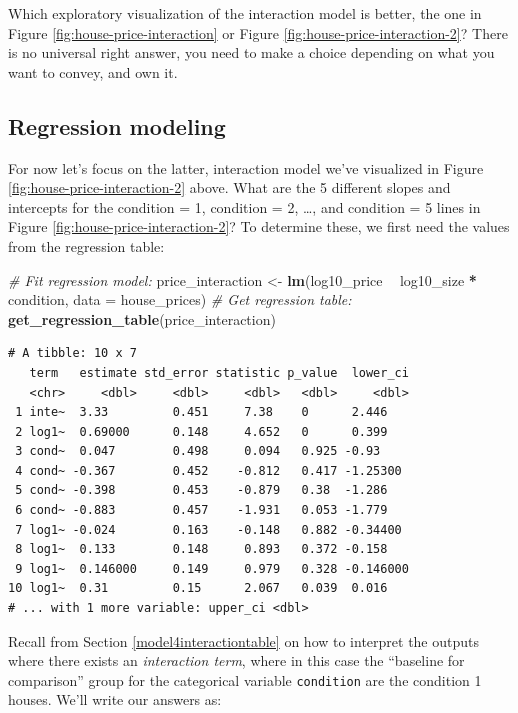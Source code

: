 \documentclass[12pt, krantz2,]{krantz}
\makeatletter
\newenvironment{Shaded}{\begin{snugshade}}{\end{snugshade}}
\newcommand{\CommentTok}[1]{\textcolor[rgb]{0.37,0.37,0.37}{\textit{#1}}}
\newcommand{\DataTypeTok}[1]{\textcolor[rgb]{0.27,0.27,0.27}{#1}}
\newcommand{\KeywordTok}[1]{\textcolor[rgb]{0.27,0.27,0.27}{\textbf{#1}}}
\newcommand{\NormalTok}[1]{#1}
\newcommand{\OperatorTok}[1]{\textcolor[rgb]{0.43,0.43,0.43}{\textbf{#1}}}
\newcommand{\StringTok}[1]{\textcolor[rgb]{0.5,0.5,0.5}{#1}}
\newenvironment{kframe}{%
\medskip{}
\setlength{\fboxsep}{.8em}
 \def\at@end@of@kframe{}%
 \ifinner\ifhmode%
  \def\at@end@of@kframe{\end{minipage}}%
  \begin{minipage}{\columnwidth}%
 \fi\fi%
 \def\FrameCommand##1{\hskip\@totalleftmargin \hskip-\fboxsep
 \colorbox{shadecolor}{##1}\hskip-\fboxsep
     \hskip-\linewidth \hskip-\@totalleftmargin \hskip\columnwidth}%
 \MakeFramed {\advance\hsize-\width
   \@totalleftmargin\z@ \linewidth\hsize
   \@setminipage}}%
 {\par\unskip\endMakeFramed%
 \at@end@of@kframe}
\renewenvironment{Shaded}{\begin{kframe}}{\end{kframe}}
\makeatother
\begin{document}
Which exploratory visualization of the interaction model is better, the one in Figure \ref{fig:house-price-interaction} or Figure \ref{fig:house-price-interaction-2}? There is no universal right answer, you need to make a choice depending on what you want to convey, and own it.

\hypertarget{house-prices-regression}{%
\subsection{Regression modeling}\label{house-prices-regression}}

For now let's focus on the latter, interaction model we've visualized in Figure \ref{fig:house-price-interaction-2} above. What are the 5 different slopes and intercepts for the condition = 1, condition = 2, \ldots{}, and condition = 5 lines in Figure \ref{fig:house-price-interaction-2}? To determine these, we first need the values from the regression table:

\begin{Shaded}
\begin{Highlighting}[]
\CommentTok{# Fit regression model:}
\NormalTok{price_interaction <-}\StringTok{ }\KeywordTok{lm}\NormalTok{(log10_price }\OperatorTok{~}\StringTok{ }\NormalTok{log10_size }\OperatorTok{*}\StringTok{ }\NormalTok{condition, }\DataTypeTok{data =}\NormalTok{ house_prices)}
\CommentTok{# Get regression table:}
\KeywordTok{get_regression_table}\NormalTok{(price_interaction)}
\end{Highlighting}
\end{Shaded}

\begin{verbatim}
# A tibble: 10 x 7
   term   estimate std_error statistic p_value  lower_ci
   <chr>     <dbl>     <dbl>     <dbl>   <dbl>     <dbl>
 1 inte~  3.33         0.451     7.38    0      2.446   
 2 log1~  0.69000      0.148     4.652   0      0.399   
 3 cond~  0.047        0.498     0.094   0.925 -0.93    
 4 cond~ -0.367        0.452    -0.812   0.417 -1.25300 
 5 cond~ -0.398        0.453    -0.879   0.38  -1.286   
 6 cond~ -0.883        0.457    -1.931   0.053 -1.779   
 7 log1~ -0.024        0.163    -0.148   0.882 -0.34400 
 8 log1~  0.133        0.148     0.893   0.372 -0.158   
 9 log1~  0.146000     0.149     0.979   0.328 -0.146000
10 log1~  0.31         0.15      2.067   0.039  0.016   
# ... with 1 more variable: upper_ci <dbl>
\end{verbatim}

Recall from Section \ref{model4interactiontable} on how to interpret the outputs where there exists an \emph{interaction term}, where in this case the ``baseline for comparison'' group for the categorical variable \texttt{condition} are the condition 1 houses. We'll write our answers as:
\end{document}
